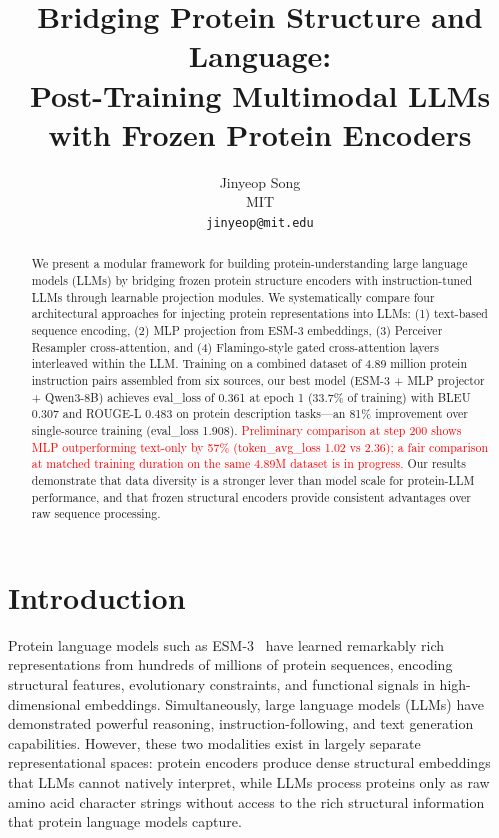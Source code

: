 \documentclass[11pt]{article}
\title{Bridging Protein Structure and Language:\\Post-Training Multimodal LLMs with Frozen Protein Encoders}
\author{
  Jinyeop Song \\
  MIT \\
  \texttt{jinyeop@mit.edu}
}
\date{}
\begin{document}
\maketitle

\begin{abstract}
We present a modular framework for building protein-understanding large language models (LLMs) by bridging frozen protein structure encoders with instruction-tuned LLMs through learnable projection modules. We systematically compare four architectural approaches for injecting protein representations into LLMs: (1) text-based sequence encoding, (2) MLP projection from ESM-3 embeddings, (3) Perceiver Resampler cross-attention, and (4) Flamingo-style gated cross-attention layers interleaved within the LLM. Training on a combined dataset of 4.89 million protein instruction pairs assembled from six sources, our best model (ESM-3 + MLP projector + Qwen3-8B) achieves eval\_loss of 0.361 at epoch 1 (33.7\% of training) with BLEU 0.307 and ROUGE-L 0.483 on protein description tasks---an 81\% improvement over single-source training (eval\_loss 1.908). \textcolor{red}{Preliminary comparison at step 200 shows MLP outperforming text-only by 57\% (token\_avg\_loss 1.02 vs 2.36); a fair comparison at matched training duration on the same 4.89M dataset is in progress.} Our results demonstrate that data diversity is a stronger lever than model scale for protein-LLM performance, and that frozen structural encoders provide consistent advantages over raw sequence processing.
\end{abstract}

\section{Introduction}

Protein language models such as ESM-3~\cite{hayes2024simulating} have learned remarkably rich representations from hundreds of millions of protein sequences, encoding structural features, evolutionary constraints, and functional signals in high-dimensional embeddings. Simultaneously, large language models (LLMs) have demonstrated powerful reasoning, instruction-following, and text generation capabilities. However, these two modalities exist in largely separate representational spaces: protein encoders produce dense structural embeddings that LLMs cannot natively interpret, while LLMs process proteins only as raw amino acid character strings without access to the rich structural information that protein language models capture.
\end{document}
